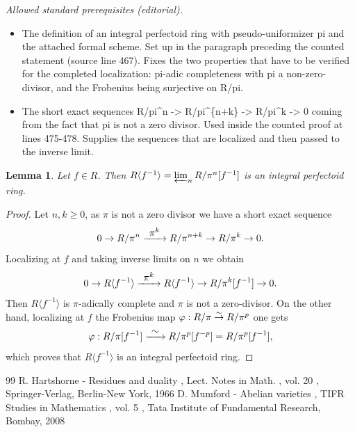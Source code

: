 \documentclass[10pt,a4paper]{amsart}
\newcommand\To[1]{\mathchoice{\xrightarrow{\textstyle\kern4pt#1\kern3pt}}{\stackrel{#1}{\to}}{}{}}
\numberwithin{equation}{section}
\newtheorem{lem}[prop]{Lemma}
\theoremstyle{definition}
\begin{document}
\noindent\textit{Allowed standard prerequisites (editorial).}\begin{itemize}
\item The definition of an integral perfectoid ring with pseudo-uniformizer pi and the attached formal scheme. Set up in the paragraph preceding the counted statement (source line 467). Fixes the two properties that have to be verified for the completed localization: pi-adic completeness with pi a non-zero-divisor, and the Frobenius being surjective on R/pi.
\item The short exact sequences R/pi\textasciicircum{}n -> R/pi\textasciicircum{}\{n+k\} -> R/pi\textasciicircum{}k -> 0 coming from the fact that pi is not a zero divisor. Used inside the counted proof at lines 475-478. Supplies the sequences that are localized and then passed to the inverse limit.
\end{itemize}\medskip
\begin{lem}
\label{lemLocalizationperf}
Let $f\in R$. Then $R\langle f^{-1} \rangle= \varprojlim_n R/\pi^n [f^{-1}]$ is an integral perfectoid ring.
\end{lem}

\begin{proof}
Let $n,k\geq 0$, as $\pi$ is not a zero divisor we have a short exact sequence
\[
0\to R/\pi^n \To{\pi^k} R/\pi^{n+k}\to R/\pi^k \to 0.
\]
Localizing at $f$ and taking inverse limits on $n$ we obtain
\[
0\to R\langle f^{-1}\rangle\To{\pi^k} R\langle f^{-1} \rangle\to R/\pi^{k} [f^{-1}]\to 0.
\]
Then $R\langle f^{-1} \rangle$ is $\pi$-adically complete and $\pi$ is not a zero-divisor. On the other hand, localizing at $f$ the Frobenius map
$\varphi: R/\pi \To{\sim} R/\pi^p$ one gets
\[
\varphi: R/\pi[f^{-1}]\To{\sim} R/\pi^{p}[f^{-p}]= R/\pi^p [f^{-1}],
\]
which proves that $R\langle f^{-1}\rangle$ is an integral perfectoid ring.
\end{proof}

\begin{thebibliography}{99}
 R. Hartshorne - Residues and duality , Lect. Notes in Math. , vol. 20 , Springer-Verlag, Berlin-New York, 1966
 D. Mumford - Abelian varieties , TIFR Studies in Mathematics , vol. 5 , Tata Institute of Fundamental Research, Bombay, 2008
\end{thebibliography}
\end{document}
